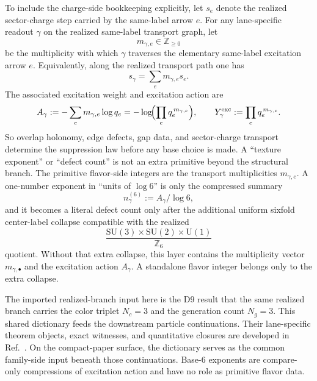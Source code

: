 \documentclass[11pt]{article}
\newcommand{\SU}{\mathrm{SU}}
\newcommand{\U}{\mathrm{U}}
\begin{document}
To include the charge-side bookkeeping explicitly, let \(s_e\) denote the realized sector-charge step carried by the same-label arrow \(e\). For any lane-specific readout \(\gamma\) on the realized same-label transport graph, let
\[
m_{\gamma,e}\in\mathbb Z_{\ge 0}
\]
be the multiplicity with which \(\gamma\) traverses the elementary same-label excitation arrow \(e\). Equivalently, along the realized transport path one has
\[
s_\gamma=\sum_e m_{\gamma,e}s_e.
\]
The associated excitation weight and excitation action are
\[
A_\gamma
:=
-\sum_e m_{\gamma,e}\log q_e
=
-\log\!\Bigl(\prod_e q_e^{\,m_{\gamma,e}}\Bigr),
\qquad
Y_\gamma^{\mathrm{exc}}
:=
\prod_e q_e^{\,m_{\gamma,e}}.
\]
So overlap holonomy, edge defects, gap data, and sector-charge transport determine the suppression law before any base choice is made. A ``texture exponent'' or ``defect count'' is not an extra primitive beyond the structural branch. The primitive flavor-side integers are the transport multiplicities \(m_{\gamma,e}\). A one-number exponent in ``units of \(\log 6\)'' is only the compressed summary
\[
n_\gamma^{(6)}:=A_\gamma/\log 6,
\]
and it becomes a literal defect count only after the additional uniform sixfold center-label collapse compatible with the realized
\[
\frac{\SU(3)\times\SU(2)\times\U(1)}{\mathbb Z_6}
\]
quotient. Without that extra collapse, this layer contains the multiplicity vector
\(m_{\gamma,\bullet}\) and the excitation action \(A_\gamma\). A standalone flavor
integer belongs only to the extra collapse.

The imported realized-branch input here is the D9 result that the same realized branch carries the color triplet \(N_c=3\) and the generation count \(N_g=3\).
This shared dictionary feeds the downstream particle continuations. Their lane-specific theorem
objects, exact witnesses, and quantitative closures are developed in
Ref.~\cite{ophparticles}. On the compact-paper surface, the dictionary serves as the common
family-side input beneath those continuations. Base-6 exponents are compare-only
compressions of excitation action and have no role as primitive flavor data.
\end{document}
